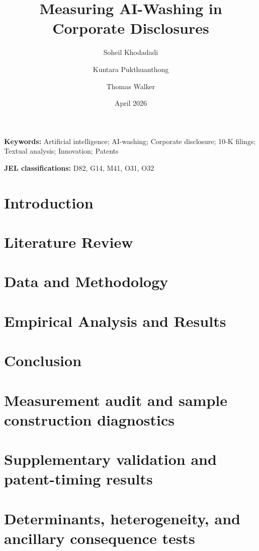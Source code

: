 \documentclass[11pt]{article}
\title{Measuring AI-Washing in Corporate Disclosures}
\author{Soheil Khodadadi \and Kuntara Pukthuanthong \and Thomas Walker}
\date{April 2026}
\begin{document}
\maketitle

\begin{abstract}

\end{abstract}

\noindent\textbf{Keywords:} Artificial intelligence; AI-washing; Corporate disclosure; 10-K filings; Textual analysis; Innovation; Patents

\noindent\textbf{JEL classifications:} D82, G14, M41, O31, O32

\section{Introduction}


\section{Literature Review}


\section{Data and Methodology}


\section{Empirical Analysis and Results}


\section{Conclusion}


\appendix

\renewcommand{\thesection}{Appendix \Alph{section}}
\renewcommand{\thetable}{\Alph{section}\arabic{table}}
\renewcommand{\thefigure}{\Alph{section}\arabic{figure}}

\clearpage
\section{Measurement audit and sample construction diagnostics}


\clearpage
\section{Supplementary validation and patent-timing results}


\clearpage
\section{Determinants, heterogeneity, and ancillary consequence tests}


\clearpage

\end{document}
